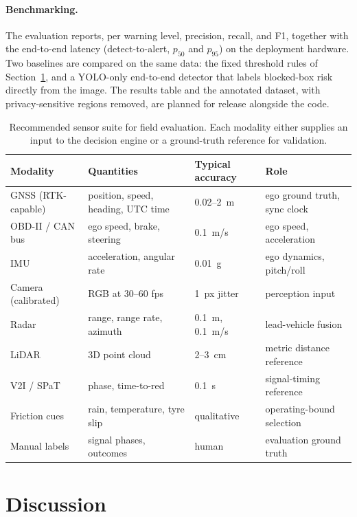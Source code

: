 \documentclass[conference, a4paper]{IEEEtran}
\theoremstyle{plain}
\begin{document}
\paragraph{Benchmarking.} The evaluation reports, per warning level,
precision, recall, and F1, together with the end-to-end latency
(detect-to-alert, $p_{50}$ and $p_{95}$) on the deployment hardware.
Two baselines are compared on the same data: the fixed threshold rules of
Section~\ref{sec:discussion}, and a YOLO-only end-to-end detector that
labels blocked-box risk directly from the image. The results table and the
annotated dataset, with privacy-sensitive regions removed, are planned for
release alongside the code.
\begin{table}[t]
\caption{Recommended sensor suite for field evaluation. Each modality
either supplies an input to the decision engine or a ground-truth reference
for validation.}
\label{tab:sensors}
\centering
\footnotesize
\begin{tabular}{@{}llll@{}}
\toprule
Modality & Quantities & Typical accuracy & Role \\
\midrule
GNSS (RTK-capable) & position, speed, heading, UTC time & 0.02--2~m & ego ground truth, sync clock \\
OBD-II / CAN bus & ego speed, brake, steering & 0.1~m/s & ego speed, acceleration \\
IMU & acceleration, angular rate & 0.01~g & ego dynamics, pitch/roll \\
Camera (calibrated) & RGB at 30--60 fps & 1~px jitter & perception input \\
Radar & range, range rate, azimuth & 0.1~m, 0.1~m/s & lead-vehicle fusion \\
LiDAR & 3D point cloud & 2--3~cm & metric distance reference \\
V2I / SPaT & phase, time-to-red & 0.1~s & signal-timing reference \\
Friction cues & rain, temperature, tyre slip & qualitative & operating-bound selection \\
Manual labels & signal phases, outcomes & human & evaluation ground truth \\
\bottomrule
\end{tabular}
\end{table}

\section{Discussion}
\label{sec:discussion}
\end{document}
